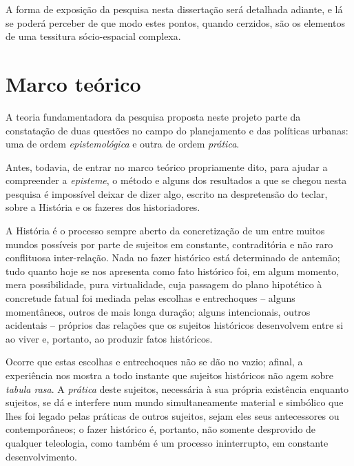 A forma de exposição da pesquisa nesta dissertação será detalhada adiante, e lá se poderá perceber de que modo estes pontos, quando cerzidos, são os elementos de uma tessitura sócio-espacial complexa.

\section{Marco teórico}\label{sec:marcteor}

A teoria fundamentadora da pesquisa proposta neste projeto parte da constatação de duas questões no campo do planejamento e das políticas urbanas: uma de ordem \textit{epistemológica} e outra de ordem \textit{prática}.

Antes, todavia, de entrar no marco teórico propriamente dito, para ajudar a compreender a \textit{episteme}, o método e alguns dos resultados a que se chegou nesta pesquisa é impossível deixar de dizer algo, escrito na despretensão do teclar, sobre a História e os fazeres dos historiadores.

A História é o processo sempre aberto da concretização de um entre muitos mundos possíveis por parte de sujeitos em constante, contraditória e não raro conflituosa inter-relação. Nada no fazer histórico está determinado de antemão; tudo quanto hoje se nos apresenta como fato histórico foi, em algum momento, mera possibilidade, pura virtualidade, cuja passagem do plano hipotético à concretude fatual foi mediada pelas escolhas e entrechoques – alguns momentâneos, outros de mais longa duração; alguns intencionais, outros acidentais – próprios das relações que os sujeitos históricos desenvolvem entre si ao viver e, portanto, ao produzir fatos históricos.

Ocorre que estas escolhas e entrechoques não se dão no vazio; afinal, a experiência nos mostra a todo instante que sujeitos históricos não agem sobre \textit{tabula rasa}. A \textit{prática} deste sujeitos, necessária à sua própria existência enquanto sujeitos, se dá e interfere num mundo simultaneamente material e simbólico que lhes foi legado pelas práticas de outros sujeitos, sejam eles seus antecessores ou contemporâneos; o fazer histórico é, portanto, não somente desprovido de qualquer teleologia, como também é um processo ininterrupto, em constante desenvolvimento.

